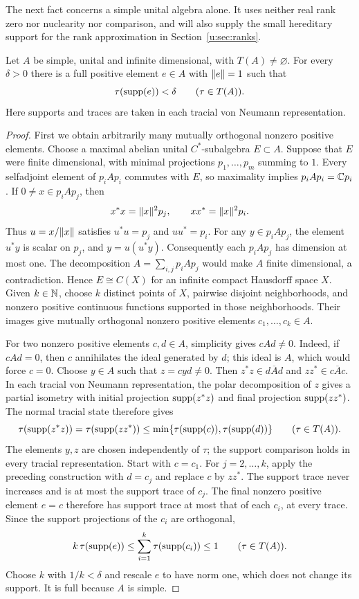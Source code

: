 The next fact concerns a simple unital algebra alone. It uses neither
real rank zero nor nuclearity nor comparison, and will also supply the
small hereditary support for the rank approximation in
Section~\ref{u:sec:ranks}.

\begin{lemma}
\label{u:lem:thin-full}
Let $A$ be simple, unital and infinite dimensional, with
$T(A)\ne\varnothing$.  For every $\delta>0$ there is a full positive element
$e\in A$ with $\lVert e\rVert=1$ such that
\[
 \tau(\operatorname{supp}(e))<\delta\qquad(\tau\in T(A)).
\]
Here supports and traces are taken in each tracial von Neumann representation.
\end{lemma}

\begin{proof}
First we obtain arbitrarily many mutually orthogonal nonzero positive
elements.  Choose a maximal abelian unital $C^*$-subalgebra $E\subset A$.
Suppose that $E$ were finite dimensional, with minimal projections
$p_1,\ldots,p_m$ summing to $1$.  Every selfadjoint element of $p_iAp_i$
commutes with $E$, so maximality implies $p_iAp_i=\mathbb C p_i$.  If
$0\ne x\in p_iAp_j$, then
\[
 x^*x=\lVert x\rVert^2p_j,\qquad xx^*=\lVert x\rVert^2p_i.
\]
Thus $u=x/\lVert x\rVert$ satisfies $u^*u=p_j$ and $uu^*=p_i$.  For any
$y\in p_iAp_j$, the element $u^*y$ is scalar on $p_j$, and
$y=u(u^*y)$.  Consequently each $p_iAp_j$ has dimension at most one.
The decomposition $A=\sum_{i,j}p_iAp_j$ would make $A$ finite
dimensional, a contradiction.  Hence $E\cong C(X)$ for an infinite
compact Hausdorff space $X$.  Given $k\in\mathbb N$, choose $k$ distinct points
of $X$, pairwise disjoint neighborhoods, and nonzero positive continuous
functions supported in those neighborhoods.  Their images give mutually
orthogonal nonzero positive elements $c_1,\ldots,c_k\in A$.

For two nonzero positive elements $c,d\in A$, simplicity gives $cAd\ne0$.
Indeed, if $cAd=0$, then $c$ annihilates the ideal generated by $d$;
this ideal is $A$, which would force $c=0$.  Choose $y\in A$ such that
$z=cyd\ne0$.  Then $z^*z\in\overline{dAd}$ and $zz^*\in\overline{cAc}$.
In each tracial von Neumann representation, the polar decomposition of
$z$ gives a partial isometry with
initial projection $\operatorname{supp}(z^*z)$ and final projection $\operatorname{supp}(zz^*)$.
The normal tracial state therefore gives
\[
 \tau(\operatorname{supp}(z^*z))=\tau(\operatorname{supp}(zz^*))
 \le \min\{\tau(\operatorname{supp}(c)),\tau(\operatorname{supp}(d))\}
 \qquad(\tau\in T(A)).
\]
The elements $y,z$ are chosen independently of $\tau$; the support
comparison holds in every tracial representation.
Start with $c=c_1$. For $j=2,\ldots,k$, apply the preceding construction
with $d=c_j$ and replace $c$ by $zz^*$. The support trace never increases
and is at most the support trace of $c_j$. The final nonzero positive
element $e=c$ therefore has support trace at most that of each $c_i$,
at every trace.  Since the support
projections of the $c_i$ are orthogonal,
\[
 k\,\tau(\operatorname{supp}(e))\le\sum_{i=1}^k\tau(\operatorname{supp}(c_i))\le1
 \qquad(\tau\in T(A)).
\]
Choose $k$ with $1/k<\delta$ and rescale $e$ to have norm one, which
does not change its support.  It is full because $A$ is simple.
\end{proof}

